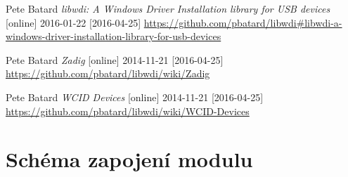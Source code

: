 \documentclass[czech,master,public,dept460,male,cpdeclaration]{diploma}	%
\begin{document}
\begin{thebibliography}{99}
 Pete Batard
\textit{libwdi: A Windows Driver Installation library for USB devices} [online] 2016-01-22 [2016-04-25]
\url{https://github.com/pbatard/libwdi#libwdi-a-windows-driver-installation-library-for-usb-devices}

 Pete Batard
\textit{Zadig} [online] 2014-11-21 [2016-04-25]
\url{https://github.com/pbatard/libwdi/wiki/Zadig}

 Pete Batard
\textit{WCID Devices} [online] 2014-11-21 [2016-04-25]
\url{https://github.com/pbatard/libwdi/wiki/WCID-Devices}

\end{thebibliography}




\appendix


\section{Schéma zapojení modulu}
\end{document}

